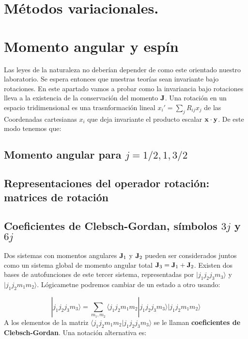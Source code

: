 \section{Métodos variacionales.}

\section{Momento angular y espín}

Las leyes de la naturaleza no deberían depender de como este orientado nuestro laboratorio. Se espera entonces que nuestras teorías sean invariante bajo rotaciones. En este apartado vamos a probar como la invariancia bajo rotaciones lleva a la existencia de la conservación del momento $\mathbf{J}$. Una rotación en un espacio tridimensional es una trasnformación lineal $x_i'=\sum_j R_{ij} x_j$ de las Coordenadas cartesianas  $x_i$ que deja invariante el producto escalar $\mathbf{x} \cdot \mathbf{y}$. De este modo tenemos que:

\subsection{Momento angular para $j=1/2,1,3/2$}

\subsection{Representaciones del operador rotación: matrices de rotación}


\subsection{Coeficientes de Clebsch-Gordan, símbolos $3j$ y $6j$}

Dos sistemas con momentos angulares $\mathbf{J}_1$ y $\mathbf{J}_2$ pueden ser considerados juntos como un sistema global de momento angular total $\mathbf{J}_3 = \mathbf{J}_1 + \mathbf{J}_2$. Existen dos bases de autofunciones de este tercer sistema, representadas por $|j_1 j_2 j_3 m_3\rangle$ y $|j_1 j_2 m_1 m_2\rangle$. Lógicametne podremos cambiar de un estado a otro usando:

\begin{equation}
   |j_1 j_2 j_3 m_3 \rangle  = \sum_{m_1, m_2}  \langle j_1 j_2 m_1 m_2 | j_1 j_2 j_3 m_3 \rangle    |j_1 j_2 m_1 m_2\rangle
\end{equation}
A los elementos de la matriz $\langle j_1 j_2 m_1 m_2 | j_1 j_2 j_3 m_3 \rangle$ se le llaman \textbf{coeficientes de Clebsch-Gordan}. Una notación alternativa es:

